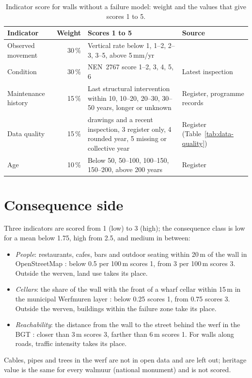 \begin{table}[htbp]
\centering
\small
\caption{Indicator score for walls without a failure model: weight and the
values that give scores 1 to 5.}
\label{tab:portfolio-indicators}
\begin{tabularx}{\textwidth}{@{}l r >{\raggedright\arraybackslash}X >{\raggedright\arraybackslash}p{3.4cm}@{}}
\toprule
Indicator & Weight & Scores 1 to 5 & Source \\
\midrule
Observed movement & 30\,\% & Vertical rate below 1, 1--2, 2--3, 3--5, above 5\,mm/yr & \textcite{bodemdalingskaart} \\
Condition & 30\,\% & NEN~2767 score 1--2, 3, 4, 5, 6 & Latest inspection \parencite{nen2767} \\
Maintenance history & 15\,\% & Last structural intervention within 10, 10--20, 20--30, 30--50 years, longer or unknown & Register, programme records \\
Data quality & 15\,\% & 1 drawings and a recent inspection, 3 register only, 4 rounded year, 5 missing or collective year & Register (Table~\ref{tab:data-quality}) \\
Age & 10\,\% & Below 50, 50--100, 100--150, 150--200, above 200 years & Register \\
\bottomrule
\end{tabularx}
\end{table}

\section{Consequence side}\label{app:portfolio-consequence}

Three indicators are scored from 1 (low) to 3 (high); the consequence class is
low for a mean below 1.75, high from 2.5, and medium in between:
\begin{itemize}
  \item \emph{People}: restaurants, cafes, bars and outdoor seating within
    20\,m of the wall in OpenStreetMap \parencite{osm2026}: below 0.5 per
    100\,m scores 1, from 3 per 100\,m scores 3. Outside the werven, land use
    takes its place.
  \item \emph{Cellars}: the share of the wall with the front of a wharf cellar
    within 15\,m in the municipal Werfmuren layer \parencite{utrecht_werfmuren}:
    below 0.25 scores 1, from 0.75 scores 3. Outside the werven, buildings
    within the failure zone take its place.
  \item \emph{Reachability}: the distance from the wall to the street behind
    the werf in the BGT \parencite{bgt}: closer than 3\,m scores 3, farther than
    6\,m scores 1. For walls along roads, traffic intensity takes its place.
\end{itemize}
Cables, pipes and trees in the werf are not in open data and are left out;
heritage value is the same for every walmuur (national monument) and is not
scored.

